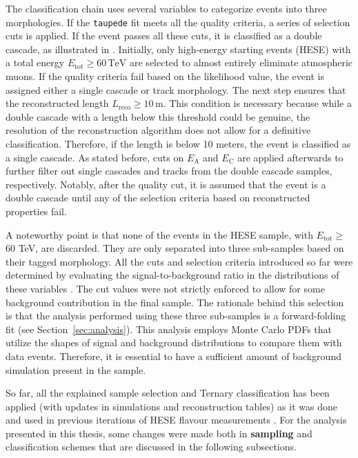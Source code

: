 The classification chain uses several variables to categorize events into three morphologies. If the \texttt{taupede} fit meets all the quality criteria, a series of selection cuts is applied. If the event passes all these cuts, it is classified as a double cascade, as illustrated in . Initially, only high-energy starting events (HESE) with a total energy \(E_{\mathrm{tot}} \geq 60 \, \text{TeV}\) are selected to almost entirely eliminate atmospheric muons. If the quality criteria fail based on the likelihood value, the event is assigned either a single cascade or track morphology. The next step ensures that the reconstructed length \(L_{\mathrm{reco}} \geq 10 \, \text{m}\). This condition is necessary because while a double cascade with a length below this threshold could be genuine, the resolution of the reconstruction algorithm does not allow for a definitive classification. Therefore, if the length is below 10 meters, the event is classified as a single cascade. As stated before, cuts on \(E_{\text{A}}\) and \(E_{\text{C}}\) are applied afterwards to further filter out single cascades and tracks from the double cascade samples, respectively. Notably, after the quality cut, it is assumed that the event is a double cascade until any of the selection criteria based on reconstructed properties fail.

A noteworthy point is that none of the events in the HESE sample, with $E_{\mathrm{tot}} \geq$ 60 TeV, are discarded. They are only separated into three sub-samples based on their tagged morphology. All the cuts and selection criteria introduced so far were determined by evaluating the signal-to-background ratio in the distributions of these variables . The cut values were not strictly enforced to allow for some background contribution in the final sample. The rationale behind this selection is that the analysis performed using these three sub-samples is a forward-folding fit (see Section~\ref{sec:analysis}). This analysis employs Monte Carlo PDFs that utilize the shapes of signal and background distributions to compare them with data events. Therefore, it is essential to have a sufficient amount of background simulation present in the sample.

So far, all the explained sample selection and Ternary classification has been applied (with updates in simulations and reconstruction tables) as it was done and used in previous iterations of HESE flavour measurements . For the analysis presented in this thesis, some changes were made both in \textbf{sampling} and classification schemes that are discussed in the following subsections. 

